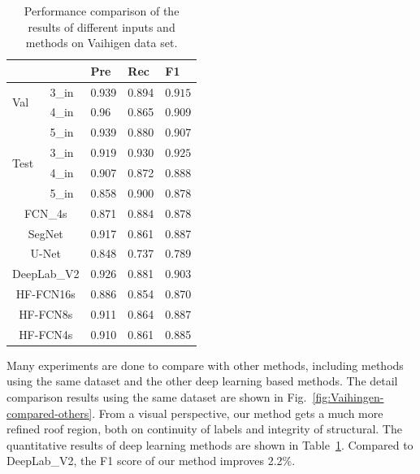 \begin{table}[htbp]
\caption {Performance comparison of the results of different inputs and methods on Vaihigen data set. }
\label{table:vaihigen-3-4-5in-comp}
\centering
\begin{tabular}{p{0.5cm}<{\centering}|p{1.1cm}<{\centering}|p{1.1cm}<{\centering}|p{1.1cm}<{\centering}|p{1.1cm}<{\centering}}
\hline
&&Pre&Rec&F1\\
\hline
\multirow{2}{*}{Val}&3\_in&0.939&0.894&$\bm{0.915}$\\
&4\_in&0.96&0.865&0.909\\
&5\_in&0.939&0.880&0.907\\
\hline
\multirow{2}{*}{Test}&3\_in&$\bm{0.919}$&$\bm{0.930}$&$\bm{0.925}$\\
&4\_in&0.907&0.872&0.888\\
&5\_in&0.858&0.900&0.878\\
\hline\hline
\multicolumn{2}{c|}{FCN\_4s\cite{IEEEexample:Long_2015_CVPR}}&{0.871}&$\bm{0.884}$&{0.878}\\
\multicolumn{2}{c|}{SegNet\cite{IEEEexample:badrinarayanan2017segnet}}&{0.917}&{0.861}&{0.887}\\
\multicolumn{2}{c|}{U-Net\cite{IEEEexample:ronneberger2015u}}&{0.848}&{0.737}&{0.789}\\
\multicolumn{2}{c|}{DeepLab\_V2\cite{IEEEexample:chen2016deeplab}}&$\bm{0.926}$&{0.881}&$\bm{0.903}$\\
\hline \hline
\multicolumn{2}{c|}{HF-FCN16s}&{0.886}&{0.854}&{0.870}\\
\multicolumn{2}{c|}{HF-FCN8s}&{0.911}&{0.864}&{0.887}\\
\multicolumn{2}{c|}{HF-FCN4s}&{0.910}&{0.861}&{0.885}\\
\hline
\end{tabular}
\end{table}

Many experiments are done to compare with other methods, including methods using the same dataset and the other deep learning based methods. 
The detail comparison results using the same dataset are shown in Fig.~\ref{fig:Vaihingen-compared-others}. 
From a visual perspective, our method gets a much more refined roof region, both on continuity of labels and integrity of structural. 
The quantitative results of deep learning methods are shown in Table~\ref{table:vaihigen-3-4-5in-comp}. 
Compared to DeepLab\_V2\cite{IEEEexample:chen2016deeplab}, the F1 score of our method improves 2.2{\%}.

